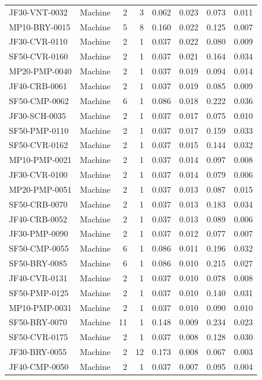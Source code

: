 \begin{longtable}{l l r r r r r r}
JF30-VNT-0032 & Machine & 2 & 3 & 0.062 & 0.023 & 0.073 & 0.011\\
MP10-BRY-0015 & Machine & 5 & 8 & 0.160 & 0.022 & 0.125 & 0.007\\
JF30-CVR-0110 & Machine & 2 & 1 & 0.037 & 0.022 & 0.080 & 0.009\\
SF50-CVR-0160 & Machine & 2 & 1 & 0.037 & 0.021 & 0.164 & 0.034\\
MP20-PMP-0040 & Machine & 2 & 1 & 0.037 & 0.019 & 0.094 & 0.014\\
JF40-CRB-0061 & Machine & 2 & 1 & 0.037 & 0.019 & 0.085 & 0.009\\
SF50-CMP-0062 & Machine & 6 & 1 & 0.086 & 0.018 & 0.222 & 0.036\\
JF30-SCH-0035 & Machine & 2 & 1 & 0.037 & 0.017 & 0.075 & 0.010\\
SF50-PMP-0110 & Machine & 2 & 1 & 0.037 & 0.017 & 0.159 & 0.033\\
SF50-CVR-0162 & Machine & 2 & 1 & 0.037 & 0.015 & 0.144 & 0.032\\
MP10-PMP-0021 & Machine & 2 & 1 & 0.037 & 0.014 & 0.097 & 0.008\\
JF30-CVR-0100 & Machine & 2 & 1 & 0.037 & 0.014 & 0.079 & 0.006\\
MP20-PMP-0051 & Machine & 2 & 1 & 0.037 & 0.013 & 0.087 & 0.015\\
SF50-CRB-0070 & Machine & 2 & 1 & 0.037 & 0.013 & 0.183 & 0.034\\
JF40-CRB-0052 & Machine & 2 & 1 & 0.037 & 0.013 & 0.089 & 0.006\\
JF30-PMP-0090 & Machine & 2 & 1 & 0.037 & 0.012 & 0.077 & 0.007\\
SF50-CMP-0055 & Machine & 6 & 1 & 0.086 & 0.011 & 0.196 & 0.032\\
SF50-BRY-0085 & Machine & 6 & 1 & 0.086 & 0.010 & 0.215 & 0.027\\
JF40-CVR-0131 & Machine & 2 & 1 & 0.037 & 0.010 & 0.078 & 0.008\\
SF50-PMP-0125 & Machine & 2 & 1 & 0.037 & 0.010 & 0.140 & 0.031\\
MP10-PMP-0031 & Machine & 2 & 1 & 0.037 & 0.010 & 0.090 & 0.010\\
SF50-BRY-0070 & Machine & 11 & 1 & 0.148 & 0.009 & 0.234 & 0.023\\
SF50-CVR-0175 & Machine & 2 & 1 & 0.037 & 0.008 & 0.128 & 0.030\\
JF30-BRY-0055 & Machine & 2 & 12 & 0.173 & 0.008 & 0.067 & 0.003\\
JF40-CMP-0050 & Machine & 2 & 1 & 0.037 & 0.007 & 0.095 & 0.004\\

\end{longtable}
